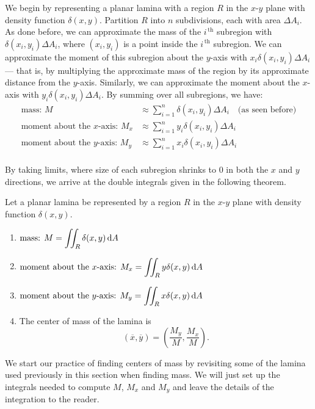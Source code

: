 We begin by representing a planar lamina with a region $R$ in the $x$-$y$ plane with density function $\delta(x,y)$. Partition $R$ into $n$ subdivisions, each with area $\Delta A_i$. As done before, we can approximate the mass of the $i^{\,\text{th}}$ subregion with $\delta(x_i,y_i)\Delta A_i$, where $(x_i,y_i)$ is a point inside the $i^{\,\text{th}}$ subregion. We can approximate the moment of this subregion about the $y$-axis with $x_i\delta(x_i,y_i)\Delta A_i$ --- that is, by multiplying the approximate mass of the region by its approximate distance from the $y$-axis. Similarly, we can approximate the moment about the $x$-axis with $y_i\delta(x_i,y_i)\Delta A_i$. By summing over all subregions, we have:
\begin{align*}
\text{mass: } M &\approx \sum_{i=1}^n \delta(x_i,y_i)\Delta A_i\quad \text{(as seen before)}\\
\text{moment about the $x$-axis: } M_x &\approx \sum_{i=1}^n y_i\delta(x_i,y_i)\Delta A_i\\
\text{moment about the $y$-axis: } M_y &\approx \sum_{i=1}^n x_i\delta(x_i,y_i)\Delta A_i\\
\end{align*}

By taking limits, where size of each subregion shrinks to 0 in both the $x$ and $y$ directions, we arrive at the double integrals given in the following theorem.

\begin{theorem}\label{thm:center_of_mass}%
Let a planar lamina be represented by a region $R$ in the $x$-$y$ plane with density function $\delta(x,y)$. 
\begin{enumerate}
	\item $\displaystyle \text{mass: } M = \iint_R\delta(x,y)\operatorname{d}\! A$
	\item	$\displaystyle \text{moment about the $x$-axis: } M_x = \iint_Ry\delta(x,y)\operatorname{d}\! A$
	\item	$\displaystyle \text{moment about the $y$-axis: } M_y = \iint_Rx\delta(x,y)\operatorname{d}\! A$
	\item The center of mass  of the lamina is
	\[(\overline{x},\overline{y}) = \left(\frac{M_y}{M},\frac{M_x}M\right).\]
\end{enumerate}
\end{theorem}

We start our practice of finding centers of mass by revisiting some of the lamina used previously in this section when finding mass. We will  just set up the integrals needed to compute $M$, $M_x$ and $M_y$ and leave the details of the integration to the reader.

